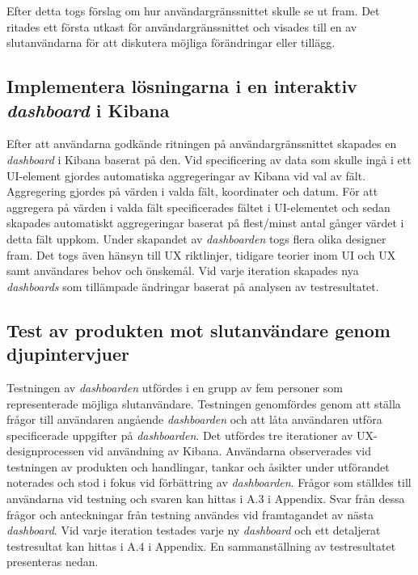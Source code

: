 \documentclass[12pt]{kththesis}
\begin{document}
Efter detta togs förslag om hur användargränssnittet skulle se ut fram. Det ritades ett första utkast för användargränssnittet och visades till en av slutanvändarna för att diskutera möjliga förändringar eller tillägg. 

\subsection{Implementera lösningarna i en interaktiv \textit{dashboard} i Kibana }
Efter att användarna godkände ritningen på användargränssnittet skapades en \textit{dashboard} i Kibana baserat på den. Vid specificering av data som skulle ingå i ett UI-element gjordes automatiska aggregeringar av Kibana vid val av fält. Aggregering gjordes på värden i valda fält, koordinater och datum. För att aggregera på värden i valda fält specificerades fältet i UI-elementet och sedan skapades automatiskt aggregeringar baserat på flest/minst antal gånger värdet i detta fält uppkom. Under skapandet av \textit{dashboarden} togs flera olika designer fram. Det togs även hänsyn till UX riktlinjer, tidigare teorier inom UI och UX samt användares behov och önskemål. Vid varje iteration skapades nya \textit{dashboards} som tillämpade ändringar baserat på analysen av testresultatet.

\subsection{Test av produkten mot slutanvändare genom djupintervjuer}
Testningen av \textit{dashboarden} utfördes i en grupp av fem personer som representerade möjliga slutanvändare. Testningen genomfördes genom att ställa frågor till användaren angående \textit{dashboarden} och att låta användaren utföra specificerade uppgifter på \textit{dashboarden}. Det utfördes tre iterationer av UX-designprocessen vid användning av Kibana. Användarna observerades vid testningen av produkten och handlingar, tankar och åsikter under utförandet noterades och stod i fokus vid förbättring av \textit{dashboarden}. Frågor som ställdes till användarna vid testning och svaren kan hittas i A.3 i Appendix. Svar från dessa frågor och anteckningar från testning användes vid framtagandet av nästa \textit{dashboard}. Vid varje iteration testades varje ny \textit{dashboard} och ett detaljerat testresultat kan hittas i A.4 i Appendix. En sammanställning av testresultatet presenteras nedan. 
\end{document}
